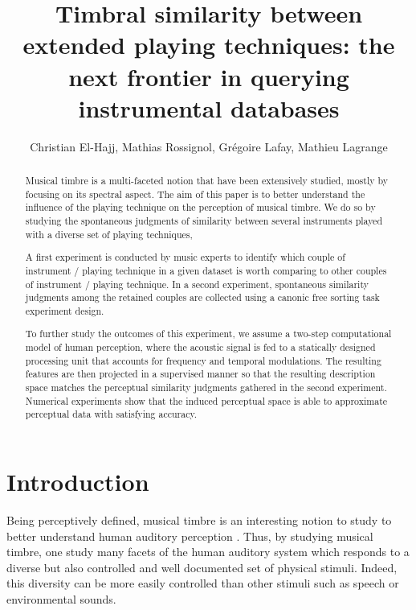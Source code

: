 \documentclass{article}
\title{Timbral similarity between extended playing techniques:
the next frontier in querying instrumental databases}
\author{
Christian El-Hajj,
Mathias Rossignol,
Gr\'egoire Lafay,
Mathieu Lagrange}
\begin{document}
\maketitle




\begin{abstract}

Musical timbre is a multi-faceted notion that have been extensively studied,
mostly by focusing on its spectral aspect.
The aim of this paper is to better understand the influence
of the playing technique on the perception of musical timbre.
We do so by studying the spontaneous judgments of similarity between several
instruments played with a diverse set of playing techniques,

A first experiment is conducted by music experts to identify
which couple of instrument / playing technique in a given dataset
is worth comparing to other couples of instrument / playing technique.
In a second experiment, spontaneous similarity
judgments among the retained couples are collected
using a canonic free sorting task experiment design.

To further study the outcomes of this experiment, we assume a
two-step computational model of human perception, where the acoustic signal
is fed to a statically designed processing unit that accounts for frequency
and temporal modulations.
The resulting features are then projected in a supervised manner so that
the resulting description space matches the perceptual similarity judgments
gathered in the second experiment.
Numerical experiments show that the induced perceptual space
is able to approximate perceptual data with satisfying accuracy.

\end{abstract}


\section{Introduction}\label{sec:introduction}

Being perceptively defined, musical timbre is an interesting notion to study to better understand human auditory perception \cite{grey1977multidimensional}. Thus, by studying musical timbre, one study many facets of the human auditory system which responds to a diverse but also controlled and well documented set of physical stimuli. Indeed, this diversity can be more easily controlled than other stimuli such as speech or environmental sounds.
\end{document}
